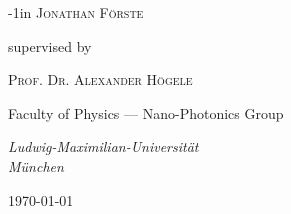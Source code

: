 \begin{titlepage}
\begin{adjustwidth*}{}{-1in}
	{\scshape\Large Jonathan Förste \\} %

	\vspace{10\baselineskip} %
	
	supervised by

	\vspace{0.3\baselineskip} %

	{\scshape\Large Prof. Dr. Alexander Högele \\} %

	\vspace{0.5\baselineskip}

	Faculty of Physics --- Nano-Photonics Group

	\vspace{0.5\baselineskip}

	\textit{Ludwig-Maximilian-Universität \\ München} %

	\vfill %
	
	
	
	\vspace{0.3\baselineskip} %
	
	\today%
	
\end{adjustwidth*}

\end{titlepage}


